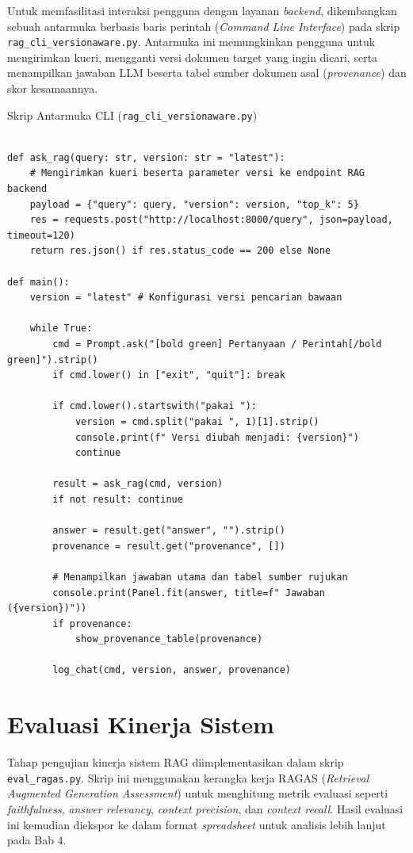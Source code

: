 Untuk memfasilitasi interaksi pengguna dengan layanan \textit{backend}, dikembangkan sebuah antarmuka berbasis baris perintah (\textit{Command Line Interface}) pada skrip \texttt{rag\_cli\_versionaware.py}. Antarmuka ini memungkinkan pengguna untuk mengirimkan kueri, mengganti versi dokumen target yang ingin dicari, serta menampilkan jawaban LLM beserta tabel sumber dokumen asal (\textit{provenance}) dan skor kesamaannya.

\begin{myblock}{Skrip Antarmuka CLI (\texttt{rag\_cli\_versionaware.py})}\label{kode:cli}
\begin{verbatim}

def ask_rag(query: str, version: str = "latest"):
    # Mengirimkan kueri beserta parameter versi ke endpoint RAG backend
    payload = {"query": query, "version": version, "top_k": 5}
    res = requests.post("http://localhost:8000/query", json=payload, timeout=120)
    return res.json() if res.status_code == 200 else None

def main():
    version = "latest" # Konfigurasi versi pencarian bawaan
    
    while True:
        cmd = Prompt.ask("[bold green] Pertanyaan / Perintah[/bold green]").strip()
        if cmd.lower() in ["exit", "quit"]: break

        if cmd.lower().startswith("pakai "):
            version = cmd.split("pakai ", 1)[1].strip()
            console.print(f" Versi diubah menjadi: {version}")
            continue

        result = ask_rag(cmd, version)
        if not result: continue

        answer = result.get("answer", "").strip()
        provenance = result.get("provenance", [])

        # Menampilkan jawaban utama dan tabel sumber rujukan
        console.print(Panel.fit(answer, title=f" Jawaban ({version})"))
        if provenance:
            show_provenance_table(provenance)
        
        log_chat(cmd, version, answer, provenance)
\end{verbatim}
\end{myblock}

\section{Evaluasi Kinerja Sistem}

Tahap pengujian kinerja sistem RAG diimplementasikan dalam skrip \texttt{eval\_ragas.py}. Skrip ini menggunakan kerangka kerja RAGAS (\textit{Retrieval Augmented Generation Assessment}) untuk menghitung metrik evaluasi seperti \textit{faithfulness}, \textit{answer relevancy}, \textit{context precision}, dan \textit{context recall}. Hasil evaluasi ini kemudian diekspor ke dalam format \textit{spreadsheet} untuk analisis lebih lanjut pada Bab 4.

